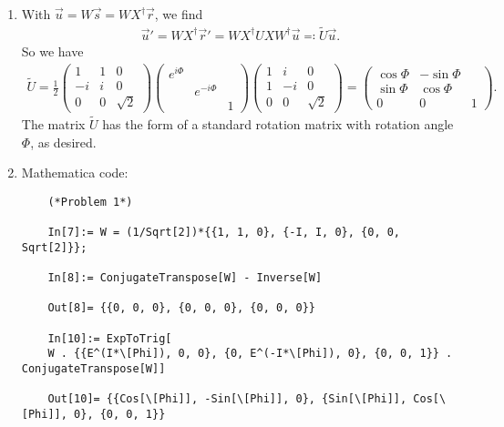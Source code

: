 \documentclass{article}
\theoremstyle{definition}
\newcommand{\f}[2]{\frac{#1}{#2}}
\begin{document}
\begin{enumerate}[label=(\alph*)]
	
	
	\item With $\vec{u} = W \vec{s} = W X^\dagger \vec{r}$, we find
	\begin{align*}
	\vec{u}' = WX^\dagger \vec{r}' = WX^\dagger U X W^\dagger \vec{u} \eqcolon \widetilde{U}\vec{u}.
	\end{align*}
	So we have
	\begin{align*}
	\widetilde{U} = \f{1}{2} \begin{pmatrix}
	1 & 1 & 0 \\ -i & i & 0 \\ 0 & 0 & \sqrt{2}
	\end{pmatrix}    
	\begin{pmatrix}
	e^{i\Phi} && \\ &e^{-i\Phi}& \\ && 1
	\end{pmatrix}
	\begin{pmatrix}
	1 & i & 0\\
	1 & -i & 0 \\
	0 & 0 & \sqrt{2}
	\end{pmatrix}
	= \begin{pmatrix*}
	\cos\Phi & -\sin\Phi & \\ \sin\Phi & \cos\Phi & \\ 0 & 0& 1
	\end{pmatrix*}.
	\end{align*}
	The matrix $\widetilde{U}$ has the form of a standard rotation matrix with rotation angle $\Phi$, as desired. 
	
	
	
	\item Mathematica code:
	\begin{lstlisting}
	(*Problem 1*)
	
	In[7]:= W = (1/Sqrt[2])*{{1, 1, 0}, {-I, I, 0}, {0, 0, Sqrt[2]}};
	
	In[8]:= ConjugateTranspose[W] - Inverse[W]
	
	Out[8]= {{0, 0, 0}, {0, 0, 0}, {0, 0, 0}}
	
	In[10]:= ExpToTrig[
	W . {{E^(I*\[Phi]), 0, 0}, {0, E^(-I*\[Phi]), 0}, {0, 0, 1}} . ConjugateTranspose[W]]
	
	Out[10]= {{Cos[\[Phi]], -Sin[\[Phi]], 0}, {Sin[\[Phi]], Cos[\[Phi]], 0}, {0, 0, 1}}
	\end{lstlisting}
\end{enumerate} 



\newpage
\end{document}

